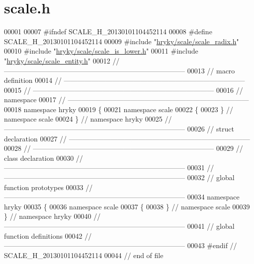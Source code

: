 \hypertarget{scale_8h_source}{\section{scale.\-h}
}

\begin{DoxyCode}
00001 
00007 \textcolor{preprocessor}{#ifndef SCALE\_H\_20130101104452114}
00008 \textcolor{preprocessor}{}\textcolor{preprocessor}{#define SCALE\_H\_20130101104452114}
00009 \textcolor{preprocessor}{}\textcolor{preprocessor}{#include "\hyperlink{scale__radix_8h}{hryky/scale/scale_radix.h}"}
00010 \textcolor{preprocessor}{#include "\hyperlink{scale__is__lower_8h}{hryky/scale/scale_is_lower.h}"}
00011 \textcolor{preprocessor}{#include "\hyperlink{scale__entity_8h}{hryky/scale/scale_entity.h}"}
00012 \textcolor{comment}{//
      ------------------------------------------------------------------------------}
00013 \textcolor{comment}{// macro definition}
00014 \textcolor{comment}{//
      ------------------------------------------------------------------------------}
00015 \textcolor{comment}{//
      ------------------------------------------------------------------------------}
00016 \textcolor{comment}{// namespace}
00017 \textcolor{comment}{//
      ------------------------------------------------------------------------------}
00018 \textcolor{keyword}{namespace }hryky
00019 \{
00021 \textcolor{keyword}{namespace }scale
00022 \{
00023 \} \textcolor{comment}{// namespace scale}
00024 \} \textcolor{comment}{// namespace hryky}
00025 \textcolor{comment}{//
      ------------------------------------------------------------------------------}
00026 \textcolor{comment}{// struct declaration}
00027 \textcolor{comment}{//
      ------------------------------------------------------------------------------}
00028 \textcolor{comment}{//
      ------------------------------------------------------------------------------}
00029 \textcolor{comment}{// class declaration}
00030 \textcolor{comment}{//
      ------------------------------------------------------------------------------}
00031 \textcolor{comment}{//
      ------------------------------------------------------------------------------}
00032 \textcolor{comment}{// global function prototypes}
00033 \textcolor{comment}{//
      ------------------------------------------------------------------------------}
00034 \textcolor{keyword}{namespace }hryky
00035 \{
00036 \textcolor{keyword}{namespace }scale
00037 \{
00038 \} \textcolor{comment}{// namespace scale}
00039 \} \textcolor{comment}{// namespace hryky}
00040 \textcolor{comment}{//
      ------------------------------------------------------------------------------}
00041 \textcolor{comment}{// global function definitions}
00042 \textcolor{comment}{//
      ------------------------------------------------------------------------------}
00043 \textcolor{preprocessor}{#endif // SCALE\_H\_20130101104452114}
00044 \textcolor{preprocessor}{}\textcolor{comment}{// end of file}
\end{DoxyCode}
